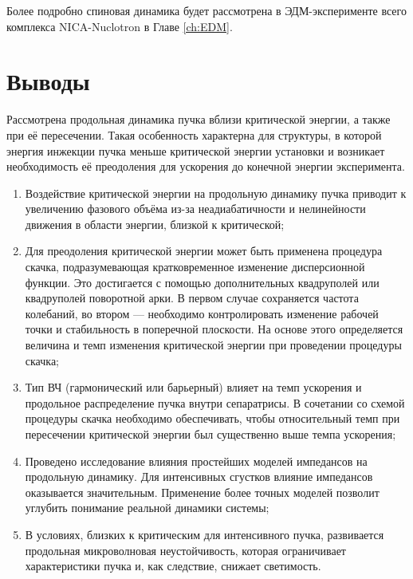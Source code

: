 \par Более подробно спиновая динамика будет рассмотрена в ЭДМ-эксперименте всего комплекса NICA-Nuclotron в Главе \ref{ch:EDM}.

\section*{Выводы}
\par Рассмотрена продольная динамика пучка вблизи критической энергии, а также при её пересечении. Такая особенность характерна для структуры, в которой энергия инжекции пучка меньше критической энергии установки и возникает необходимость её преодоления для ускорения до конечной энергии эксперимента.

\begin{enumerate}

\item Воздействие критической энергии на продольную динамику пучка приводит к увеличению фазового объёма из-за неадиабатичности и нелинейности движения в области энергии, близкой к критической;

\item Для преодоления критической энергии может быть применена процедура скачка, подразумевающая кратковременное изменение дисперсионной функции. Это достигается с помощью дополнительных квадруполей или квадруполей поворотной арки. В первом случае сохраняется частота колебаний, во втором — необходимо контролировать изменение рабочей точки и стабильность в поперечной плоскости. На основе этого определяется величина и темп изменения критической энергии при проведении процедуры скачка;

\item Тип ВЧ (гармонический или барьерный) влияет на темп ускорения и продольное распределение пучка внутри сепаратрисы. В сочетании со схемой процедуры скачка необходимо обеспечивать, чтобы относительный темп при пересечении критической энергии был существенно выше темпа ускорения;

\item Проведено исследование влияния простейших моделей импедансов на продольную динамику. Для интенсивных сгустков влияние импедансов оказывается значительным. Применение более точных моделей позволит углубить понимание реальной динамики системы;

\item В условиях, близких к критическим для интенсивного пучка, развивается продольная микроволновая неустойчивость, которая ограничивает характеристики пучка и, как следствие, снижает светимость.

\end{enumerate}


\FloatBarrier
